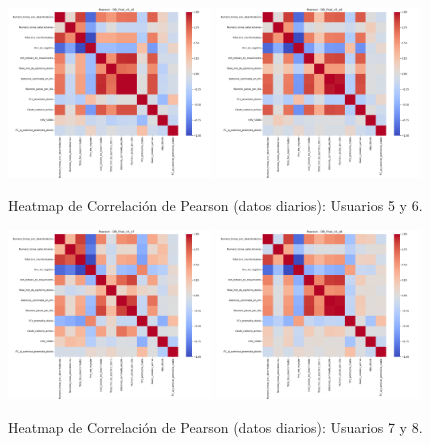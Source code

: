 \documentclass[12pt,letterpaper,twoside]{report}
\begin{document}
\begin{calculobox}
\begin{figure}[htbp]
\centering
\includegraphics[width=0.48\textwidth]{figuras/DB_final_v3_u5_heatmap_pearson.png}
\includegraphics[width=0.48\textwidth]{figuras/DB_final_v3_u6_heatmap_pearson.png}
\caption{Heatmap de Correlación de Pearson (datos diarios): Usuarios 5 y 6.}
\label{fig:corr_heatmap_u5_u6}
\end{figure}

\begin{figure}[htbp]
\centering
\includegraphics[width=0.48\textwidth]{figuras/DB_final_v3_u7_heatmap_pearson.png}
\includegraphics[width=0.48\textwidth]{figuras/DB_final_v3_u8_heatmap_pearson.png}
\caption{Heatmap de Correlación de Pearson (datos diarios): Usuarios 7 y 8.}
\label{fig:corr_heatmap_u7_u8}
\end{figure}


\end{calculobox}
\end{document}
